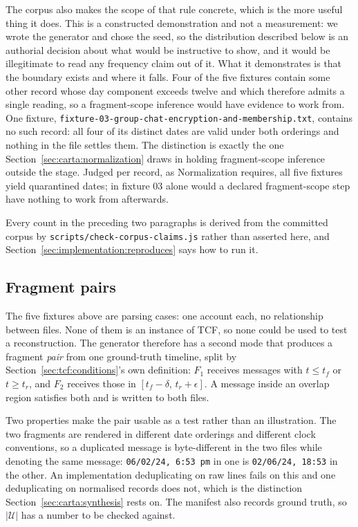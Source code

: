 The corpus also makes the scope of that rule concrete, which is the more useful
thing it does. This is a constructed demonstration and not a measurement: we wrote
the generator and chose the seed, so the distribution described below is an
authorial decision about what would be instructive to show, and it would be
illegitimate to read any frequency claim out of it. What it demonstrates is that
the boundary exists and where it falls. Four of the five fixtures contain some
other record whose day component exceeds twelve and which therefore admits a
single reading, so a fragment-scope inference would have evidence to work from.
One fixture,
\texttt{fixture-03-\allowbreak group-\allowbreak chat-\allowbreak encryption-\allowbreak and-\allowbreak membership.txt},
contains no such record: all four of its distinct dates are valid under both
orderings and nothing in the file settles them. The distinction is exactly the one
Section~\ref{sec:carta:normalization} draws in holding fragment-scope inference
outside the stage. Judged per record, as Normalization requires, all five fixtures
yield quarantined dates; in fixture 03 alone would a declared fragment-scope step
have nothing to work from afterwards.

Every count in the preceding two paragraphs is derived from the committed corpus
by \texttt{scripts/\allowbreak check-\allowbreak corpus-\allowbreak claims.js}
rather than asserted here, and
Section~\ref{sec:implementation:reproduces} says how to run it.

\subsection{Fragment pairs}
\label{sec:implementation:pairs}

The five fixtures above are parsing cases: one account each, no relationship
between files. None of them is an instance of TCF, so none could be used to test
a reconstruction. The generator therefore has a second mode that produces a
fragment \emph{pair} from one ground-truth timeline, split by
Section~\ref{sec:tcf:conditions}'s own definition: $F_1$ receives messages with
$t \le t_f$ or $t \ge t_r$, and $F_2$ receives those in
$[t_f - \delta,\, t_r + \epsilon]$. A message inside an overlap region satisfies
both and is written to both files.

Two properties make the pair usable as a test rather than an illustration. The
two fragments are rendered in different date orderings and different clock
conventions, so a duplicated message is byte-different in the two files while
denoting the same message: \texttt{06/02/24, 6:53~pm} in one is
\texttt{02/06/24, 18:53} in the other. An implementation deduplicating on raw
lines fails on this and one deduplicating on normalised records does not, which
is the distinction Section~\ref{sec:carta:synthesis} rests on. The manifest also
records ground truth, so $|\mathcal{U}|$ has a number to be checked against.

